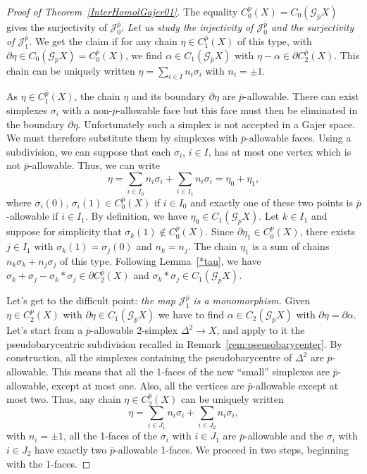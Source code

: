 \documentclass[a4paper,10pt,english,reqno]{amsart}
\theoremstyle{plain}
\theoremstyle{definition}
\theoremstyle{remark}
\numberwithin{equation}{section}
\newcommand{\thmref}[1]{Theorem~\ref{#1}}
\newcommand{\lemref}[1]{Lemma~\ref{#1}}
\newcommand{\remref}[1]{Remark~\ref{#1}}
\def\ov{\overline}
\def\cJ{{\mathcal J}}
\def\crG{{\mathscr G}}
\renewcommand\1{\hbox{\ding{192}}}
\renewcommand\2{\hbox{\ding{193}}}
\newcommand\3{\hbox{\ding{194}}}
\newcommand\4{\hbox{\ding{195}}}
\begin{document}
\begin{proof}[Proof of \thmref{InterHomolGajer01}]
%
%
%
The equality $C_0^{\ov p}(X) = C_0(\crG_{\ov p} X)$ gives  the surjectivity of $\cJ_{0}^{\ov{p}}$.
%
 \emph{Let us study the injectivity of $\cJ_{0}^{\ov{p}}$ and the surjectivity of $\cJ_{1}^{\ov{p}}$.}
 We get the claim if for any chain $ \eta \in C_1^{\ov p}(X)$   of this type,
with $ \partial \eta \in C_0(\crG_{\ov p}X) = C_0^{\ov p}(X)$,  we find 
$\alpha \in  C_1(\crG_{\ov p}X)$ with 
$\eta  - \alpha  \in \partial C_2^{\ov p}(X)$.
%
 This chain can be uniquely written 
 $\eta= \sum_{i\in I} n_i \sigma_i$ with $n_i = \pm 1$. 
 
 
 As $ \eta \in C_1^{\ov p}(X)$, the chain $\eta$ and its boundary $\partial \eta$ are $\ov{p}$-allowable.
There can exist simplexes $\sigma_{i}$ with a non-$\ov{p}$-allowable face but this face must then be eliminated in the 
boundary $\partial \eta$. 
Unfortunately such a simplex is not accepted in a Gajer space. 
We must therefore substitute them by simplexes with $\ov{p}$-allowable faces.
%
%
%
 Using a subdivision, 
 we can suppose that each $\sigma_{i}$, $i\in I$, has at most one  vertex 
 which is not $\ov{p}$-allowable. 
Thus, we can write 
 $$
 \eta= \sum_{i\in I_0} n_i \sigma_i + 
  \sum_{i\in I_1} n_i \sigma_i=\eta_{0}+\eta_{1},
$$
 where $\sigma_{i}(0),\, \sigma_{i}(1)\in C_{0}^{\ov{p}}(X)$  if $i\in I_{0}$ and exactly one of these two
 points is $\ov{p}$-allowable  if $i\in I_{1}$.
By definition, we have $ \eta_0\in C_1(\crG_{\ov p}X)$.
%
 Let  $k\in I_1$ and suppose for simplicity that  $\sigma_k(1) \not \in C_0^{\ov p}(X)$.
 Since  $\partial \eta_{1} \in C_0^{\ov p}(X)$,  there exists $j\in I_1$ with
 $\sigma_k(1)= \sigma_j(0)$ and $n_k =  n_j$.
 The chain $\eta_{1}$ is a sum of chains $n_k \sigma_k +n_j\sigma_j $ of this type. 
 Following \lemref{*tau},
 we have $ \sigma_k + \sigma_j  -  \sigma_k*\sigma_j \in  \partial  C_2^{\ov p}(X)$ and 
 $\sigma_k * \sigma_j \in C_1(\crG_{\ov p} X)$.
 
\medskip
Let's get to the  difficult point: \emph{the map $\cJ_{1}^{\ov{p}}$ is a monomorphism.}
Given $ \eta \in C_2^{\ov p}(X)$  with $ \partial \eta \in C_1(\crG_{\ov p}X)$  we have to find $\alpha  \in C_2(\crG_{\ov p}X)$   with 
$\partial \eta  =  \partial \alpha$.
%
%
%
Let's start from a $\ov{p}$-allowable 2-simplex $\Delta^2\to X$, and apply to it the pseudobarycentric subdivision 
recalled in \remref{rem:pseusobarycenter}. 
By construction, all the simplexes 
containing the pseudobarycentre of $\Delta^2$ are $\ov{p}$-allowable. 
This means that  all the 1-faces of the new ``small'' simplexes are $\ov{p}$-allowable,   except at most one.
Also, all the vertices are $\ov{p}$-allowable except at most two.
% 
Thus, any chain $ \eta \in C_2^{\ov p}(X)$ can  be uniquely written 
$$
 \eta= \sum_{i\in J_{1}} n_i \sigma_i +  \sum_{i\in J_{2}} n_i \sigma_i,
$$
%
 with $n_i = \pm 1$, all the 1-faces of the $\sigma_{i}$ with $i\in J_{1}$ are $\ov{p}$-allowable and the $\sigma_{i}$ with $i\in J_{2}$ have exactly two $\ov{p}$-allowable 1-faces.
%
 We proceed in two steps, beginning with the 1-faces.
 

\end{proof}
\end{document}
